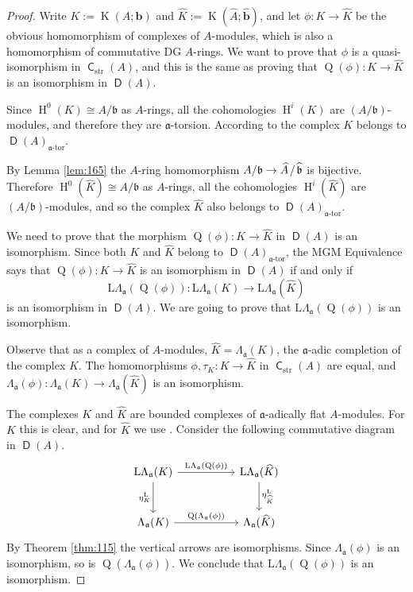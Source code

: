 \documentclass[10pt]{amsart}
\theoremstyle{definition}
\numberwithin{equation}{section}
\newcommand{\opn}{\operatorname}
\newcommand{\cat}[1]{\operatorname{\mathsf{#1}}}
\newcommand{\mfrak}[1]{\mathfrak{#1}}
\newcommand{\mrm}[1]{\mathrm{#1}}
\newcommand{\La}{\Lambda}
\renewcommand{\a}{\mfrak{a}}
\renewcommand{\b}{\mfrak{b}}
\newcommand{\bb}{\bsym{b}}
\newcommand{\tup}[1]{\textrm{#1}}
\newcommand{\bsym}[1]{\boldsymbol{#1}}
\newcommand{\what}[1]{\widehat{#1}}
\newcommand{\msp}[1]{\mspace{#1 mu}}
\begin{document}
\begin{proof}
Write $K := \opn{K}(A; \bb)$ and $\what{K} := \opn{K}(\what{A}; \what{\bb})$,
and let $\phi : K \to \what{K}$ be the obvious homomorphism of complexes of
$A$-modules, which is also a homomorphism of commutative DG $A$-rings.
We want to prove that $\phi$ is a quasi-isomorphism in
$\cat{C}_{\mrm{str}}(A)$,
and this is the same as proving that $\opn{Q}(\phi) : K \to \what{K}$
is an isomorphism in $\cat{D}(A)$.

Since $\opn{H}^0(K) \cong A / \b$ as $A$-rings,
all the cohomologies $\opn{H}^i(K)$ are $(A / \b)$-modules, and
therefore they are $\a$-torsion. According to
\cite[Corollary 4.32]{PSY1}
the complex $K$ belongs to $\cat{D}(A)_{\tup{$\a$-tor}}$.

By Lemma \ref{lem:165} the $A$-ring homomorphism
$A / \b \to \what{A} \msp{2} / \msp{2} \what{\b}$ is bijective.
Therefore $\opn{H}^0(\what{K}) \cong A / \b$ as $A$-rings,
all the cohomologies $\opn{H}^i(\what{K})$ are $(A / \b)$-modules, and so
the complex $\what{K}$ also belongs to
$\cat{D}(A)_{\tup{$\a$-tor}}$.

We need to prove that  the morphism
$\opn{Q}(\phi) : K \to \what{K}$ in $\cat{D}(A)$ is an
isomorphism.
Since both $K$ and $\what{K}$ belong to $\cat{D}(A)_{\tup{$\a$-tor}}$,
the MGM Equivalence \cite[Theorem 1.1]{PSY1} says that
$\opn{Q}(\phi) : K \to \what{K}$ is an
isomorphism in $\cat{D}(A)$ if and only if
\begin{equation} \label{eqn:165}
\mrm{L} \La_{\a}(\opn{Q}(\phi)) :
\mrm{L} \La_{\a}(K) \to \mrm{L} \La_{\a}(\what{K})
\end{equation}
is an isomorphism in $\cat{D}(A)$.
We are going to prove that $\mrm{L} \La_{\a}(\opn{Q}(\phi))$
is an isomorphism.

Observe that as a complex of $A$-modules,
$\what{K} = \La_{\a}(K)$, the $\a$-adic completion of the complex $K$.
The homomorphisms $\phi, \tau_K : K \to \what{K}$
in $\cat{C}_{\mrm{str}}(A)$ are equal,
and $\La_{\a}(\phi) : \La_{\a}(K) \to \La_{\a}(\what{K})$
is an isomorphism.

The complexes $K$ and $\what{K}$ are bounded complexes of $\a$-adically flat
$A$-modules. For $K$ this is clear, and for $\what{K}$ we use
\cite[Theorem 5.3]{Ye4}.
Consider the following commutative diagram in $\cat{D}(A)$.
\[ \begin{tikzcd} [column sep = 12ex, row sep = 6ex]
\mrm{L} \La_{\a}(K)
\ar[r, "{\mrm{L} \La_{\a}(\opn{Q}(\phi))}"]
\ar[d, "{\eta^{\mrm{L}}_{K}}"']
&
\mrm{L} \La_{\a}(\what{K})
\ar[d, "{\eta^{\mrm{L}}_{\what{K}}}"]
\\
\La_{\a}(K)
\ar[r, "{\opn{Q}(\La_{\a}(\phi))}"]
&
\La_{\a}(\what{K})
\end{tikzcd} \]
By Theorem \ref{thm:115} the vertical arrows are isomorphisms.
Since $\La_{\a}(\phi)$ is an isomorphism, so is
$\opn{Q}(\La_{\a}(\phi))$. We conclude that
$\mrm{L} \La_{\a}(\opn{Q}(\phi))$ is an isomorphism.
\end{proof}
\end{document}
